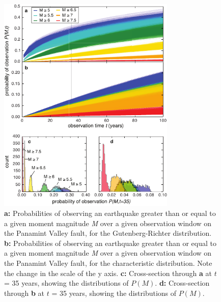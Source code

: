 \documentclass[draft,grl]{AGUTeX}
\begin{document}
\begin{figure}[th]
	\noindent\includegraphics[width=20pc]{./figures/pv_probs.pdf}
	\caption{\textbf{a:} Probabilities of observing an earthquake greater than
	or equal to a given moment magnitude \emph{M} over a given observation
	window on the Panamint Valley fault, for the Gutenberg-Richter
	distribution.  \textbf{b:} Probabilities of observing an earthquake greater
	than or equal to a given moment magnitude \emph{M} over a given observation
	window on the Panamint Valley fault, for the characteristic distribution.
	Note the change in the scale of the y axis.  \textbf{c:} Cross-section
	through \textbf{a} at $t$ = 35 years, showing the distributions of $P(M)$.
	\textbf{d:} Cross-section through \textbf{b} at $t$ = 35 years, showing the
distributions of $P(M)$.} \label{fig:pv} \end{figure}
\end{document}

